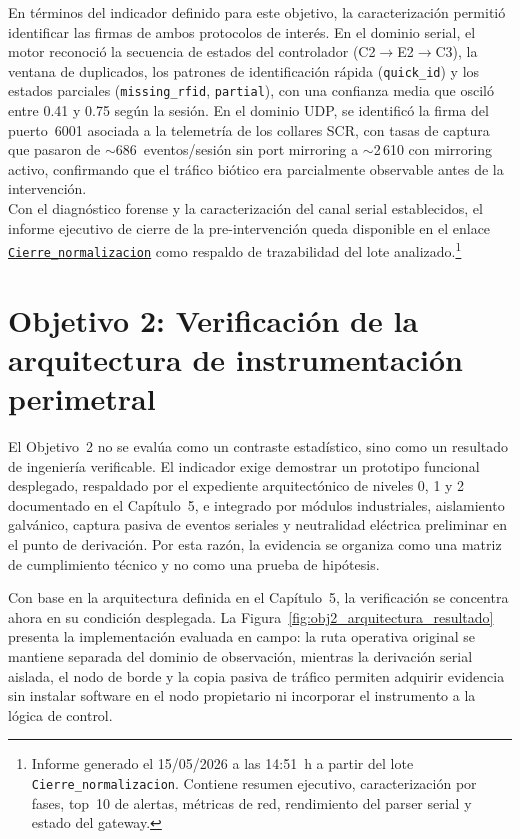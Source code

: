 En términos del indicador definido para este objetivo, la caracterización permitió identificar las firmas de ambos protocolos de interés. En el dominio serial, el motor reconoció la secuencia de estados del controlador (C2$\to$E2$\to$C3), la ventana de duplicados, los patrones de identificación rápida (\texttt{quick\_id}) y los estados parciales (\texttt{missing\_rfid}, \texttt{partial}), con una confianza media que osciló entre 0.41 y 0.75 según la sesión. En el dominio UDP, se identificó la firma del puerto~6001 asociada a la telemetría de los collares SCR, con tasas de captura que pasaron de $\sim$686~eventos/sesión sin port mirroring a $\sim$2\,610 con mirroring activo, confirmando que el tráfico biótico era parcialmente observable antes de la intervención.
\\

Con el diagnóstico forense y la caracterización del canal serial establecidos, el informe ejecutivo de cierre de la pre-intervención queda disponible en el enlace \href{https://pastebin.com/6H8YS3BT}{\texttt{Cierre\_normalizacion}} como respaldo de trazabilidad del lote analizado.\footnote{Informe generado el 15/05/2026 a las 14:51~h a partir del lote \texttt{Cierre\_normalizacion}. Contiene resumen ejecutivo, caracterización por fases, top~10 de alertas, métricas de red, rendimiento del parser serial y estado del gateway.}



\section{Objetivo 2: Verificación de la arquitectura de instrumentación perimetral}
\label{sec:obj2-resultados}

El Objetivo~2 no se evalúa como un contraste estadístico, sino como un resultado de ingeniería verificable. El indicador exige demostrar un prototipo funcional desplegado, respaldado por el expediente arquitectónico de niveles 0, 1 y 2 documentado en el Capítulo~5, e integrado por módulos industriales, aislamiento galvánico, captura pasiva de eventos seriales y neutralidad eléctrica preliminar en el punto de derivación. Por esta razón, la evidencia se organiza como una matriz de cumplimiento técnico y no como una prueba de hipótesis.

Con base en la arquitectura definida en el Capítulo~5, la verificación se concentra ahora en su condición desplegada. La Figura~\ref{fig:obj2_arquitectura_resultado} presenta la implementación evaluada en campo: la ruta operativa original se mantiene separada del dominio de observación, mientras la derivación serial aislada, el nodo de borde y la copia pasiva de tráfico permiten adquirir evidencia sin instalar software en el nodo propietario ni incorporar el instrumento a la lógica de control.

